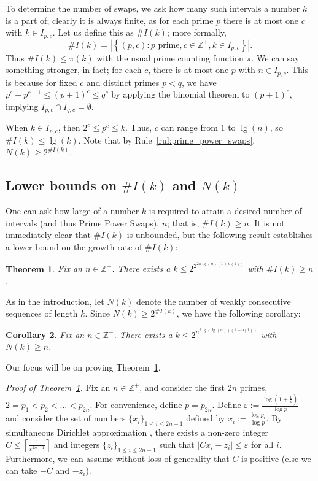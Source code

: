 \documentclass{article}
\newcommand{\Z}{\mathbb{Z}}
\newtheorem{theorem}{Theorem}[section]
\newtheorem{corollary}[theorem]{Corollary}
\theoremstyle{definition}
\theoremstyle{remark}
\numberwithin{equation}{section}
\numberwithin{case}{theorem}
\begin{document}
To determine the number of swaps, we ask how many such intervals a number $k$ is a part of; clearly it is always finite, as for each prime $p$ there is at most one $c$ with $k \in I_{p,c}$. Let us define this as $\#I(k)$; more formally,
\[
  \#I(k) = \left|\left\{ (p, c) : p \text{ prime}, c \in \Z^+, k \in I_{p,c} \right\}\right|.
\]
Thus $\#I(k) \leq \pi(k)$ with the usual prime counting function $\pi$. We can say something stronger, in fact; for each $c$, there is at most one $p$ with $n \in I_{p,c}$. This is because for fixed $c$ and distinct primes $p < q$, we have $p^c + p^{c-1} \leq (p+1)^c \leq q^c$ by applying the binomial theorem to $(p+1)^c$, implying $I_{p,c} \cap I_{q,c} = \emptyset$.

When $k \in I_{p,c}$, then $2^c \leq p^c \leq k$. Thus, $c$ can range from $1$ to $\lg(n)$, so $\#I(k) \leq \lg(k)$. Note that by Rule~\ref{rul:prime_power_swaps}, $N(k) \geq 2^{\#I(k)}$. 

\subsection{Lower bounds on \texorpdfstring{$\#I(k)$}{\#I(k)} and \texorpdfstring{$N(k)$}{N(k)}}
One can ask how large of a number $k$ is required to attain a desired number of intervals (and thus Prime Power Swaps), $n$; that is, $\#I(k) \geq n$. It is not immediately clear that $\#I(k)$ is unbounded, but the following result establishes a lower bound on the growth rate of $\#I(k)$:

\begin{theorem} \label{thm:asymptote}
  Fix an $n \in \Z^+$. There exists a $k \leq 2^{2^{2n \lg(n) (1 + o(1))}}$ with $\#I(k) \geq n$.
\end{theorem}

As in the introduction, let $N(k)$ denote the number of weakly consecutive sequences of length $k$. Since $N(k) \geq 2^{\#I(k)}$, we have the following corollary:

\begin{corollary} \label{cor:nk}
  Fix an $n \in \mathbb{Z}^+$. There exists a $k \leq 2^{n^{2 \lg(\lg (n)) (1 + o(1))}}$ with $N(k) \geq n$.
\end{corollary}

Our focus will be on proving Theorem~\ref{thm:asymptote}.

\textit{Proof of Theorem~\ref{thm:asymptote}.} Fix an $n \in \Z^+$, and consider the first $2n$ primes, $2 = p_1 < p_2 < \dots < p_{2n}$. For convenience, define $p = p_{2n}$. Define $\varepsilon := \frac{\log 
\left(1 + \frac1p\right)}{\log p}$ and consider the set of numbers $\{x_i\}_{1 \leq i \leq 2n-1}$ defined by $x_i := \frac{\log p_i}{\log p}$. By simultaneous Dirichlet approximation \cite{Dir-encyc-maths}, there exists a non-zero integer $C \leq \left\lceil \frac{1}{\varepsilon^{2n-1}} \right\rceil$ and integers $\{z_i\}_{1 \leq i \leq 2n-1}$ such that $|Cx_i - z_i| \leq \varepsilon$ for all $i$. Furthermore, we can assume without loss of generality that $C$ is positive (else we can take $-C$ and $-z_i$).
\end{document}
